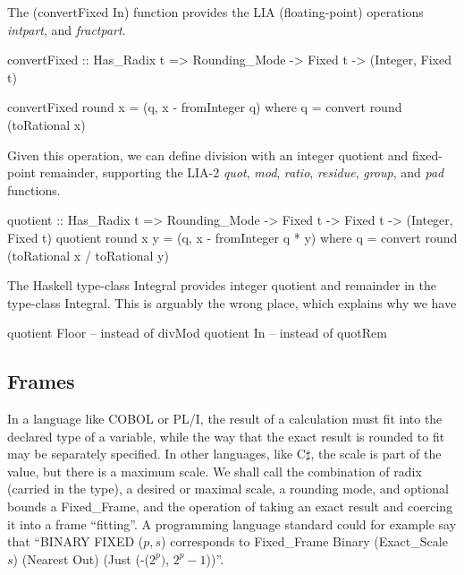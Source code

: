 \documentclass{article}
\begin{document}
The (convertFixed In) function provides the
LIA (floating-point) operations {\it intpart}, and {\it fractpart}.

\begin{code}
convertFixed :: Has_Radix t =>
    Rounding_Mode -> Fixed t -> (Integer, Fixed t)

convertFixed round x = (q, x - fromInteger q)
  where q = convert round (toRational x)
\end{code}

Given this operation, we can define division with an
integer quotient and fixed-point remainder, supporting
the LIA-2 {\it quot}, {\it mod}, {\it ratio}, {\it residue},
{\it group}, and {\it pad} functions.

\begin{code}
quotient :: Has_Radix t =>
    Rounding_Mode -> Fixed t -> Fixed t ->
    (Integer, Fixed t)
quotient round x y = (q, x - fromInteger q * y)
  where q = convert round (toRational x / toRational y)
\end{code}

The Haskell type-class Integral provides integer quotient
and remainder in the type-class Integral.  This is arguably
the wrong place, which explains why we have
\begin{code}%
quotient Floor -- instead of divMod
quotient In    -- instead of quotRem
\end{code}

\subsection{Frames}

In a language like COBOL or PL/I, the result of a calculation
must fit into the declared type of a variable, while the way
that the exact result is rounded to fit may be separately
specified.  In other languages, like C$\sharp$, the scale is
part of the value, but there is a maximum scale.  We shall
call the combination of radix (carried in the type),
a desired or maximal scale, a rounding
mode, and optional bounds a Fixed\_Frame, and the operation
of taking an exact result and coercing it into a frame ``fitting''.
A programming language standard could for example say that
``BINARY FIXED ($p,s$) corresponds to
Fixed\_Frame Binary (Exact\_Scale $s$) (Nearest Out)
(Just (-($2^p)$, $2^p-1$))''.
\end{document}
